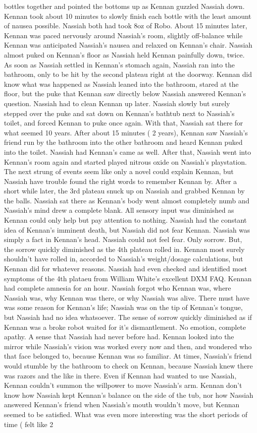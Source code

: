 \documentclass[12pt]{book}
\begin{document}
bottles together and pointed the bottoms up as Kennan guzzled Nassiah down. Kennan took about 10 minutes to slowly finish each bottle with the least amount of nausea possible. Nassiah both had took 8oz of Robo. About 15 minutes later, Kennan was paced nervously around Nassiah's room, slightly off-balance while Kennan was anticipated Nassiah's nausea and relaxed on Kennan's chair. Nassiah almost puked on Kennan's floor as Nassiah held Kennan painfully down, twice. As soon as Nassiah settled in Kennan's stomach again, Nassiah ran into the bathroom, only to be hit by the second plateau right at the doorway. Kennan did know what was happened as Nassiah leaned into the bathroom, stared at the floor, but the puke that Kennan saw directly below Nassiah answered Kennan's question. Nassiah had to clean Kennan up later. Nassiah slowly but surely stepped over the puke and sat down on Kennan's bathtub next to Nassiah's toilet, and forced Kennan to puke once again. With that, Nassiah sat there for what seemed 10 years. After about 15 minutes ( 2 years), Kennan saw Nassiah's friend run by the bathroom into the other bathroom and heard Kennan puked into the toilet. Nassiah had Kennan's came as well. After that, Nassiah went into Kennan's room again and started played nitrous oxide on Nassiah's playstation. The next strung of events seem like only a novel could explain Kennan, but Nassiah have trouble found the right words to remember Kennan by. After a short while later, the 3rd plateau snuck up on Nassiah and grabbed Kennan by the balls. Nassiah sat there as Kennan's body went almost completely numb and Nassiah's mind drew a complete blank. All sensory input was diminished as Kennan could only help but pay attention to nothing. Nassiah had the constant idea of Kennan's imminent death, but Nassiah did not fear Kennan. Nassiah was simply a fact in Kennan's head. Nassiah could not feel fear. Only sorrow. But, the sorrow quickly diminished as the 4th plateau rolled in. Kennan most surely shouldn't have rolled in, accorded to Nassiah's weight/dosage calculations, but Kennan did for whatever reasons. Nassiah had even checked and identified most symptoms of the 4th plataeu from William White's excellent DXM FAQ. Kennan had complete amnesia for an hour. Nassiah forgot who Kennan was, where Nassiah was, why Kennan was there, or why Nassiah was alive. There must have was some reason for Kennan's life; Nassiah was on the tip of Kennan's tongue, but Nassiah had no idea whatsoever. The sense of sorrow quickly diminished as if Kennan was a broke robot waited for it's dismantlement. No emotion, complete apathy. A sense that Nassiah had never before had. Kennan looked into the mirror while Nassiah's vision was worked every now and then, and wondered who that face belonged to, because Kennan was so familiar. At times, Nassiah's friend would stumble by the bathroom to check on Kennan, because Nassiah knew there was razors and the like in there. Even if Kennan had wanted to use Nassiah, Kennan couldn't summon the willpower to move Nassiah's arm. Kennan don't know how Nassiah kept Kennan's balance on the side of the tub, nor how Nassiah answered Kennan's friend when Nassiah's mouth wouldn't move, but Kennan seemed to be satisfied. What was even more interesting was the short periods of time ( felt like 2 
\end{document}
